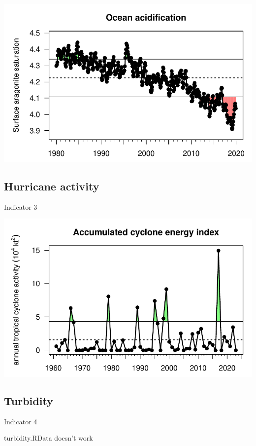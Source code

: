 \documentclass[
  letterpaper,
  oneside,
  open=any]{scrbook}
\begin{document}
\includegraphics{Report_book_files/Risk_indicators_files/figure-pdf/unnamed-chunk-2-1.pdf}

\hypertarget{hurricane-activity}{%
\subsection{Hurricane activity}\label{hurricane-activity}}

Indicator 3

\includegraphics{Report_book_files/Risk_indicators_files/figure-pdf/unnamed-chunk-3-1.pdf}

\hypertarget{turbidity}{%
\subsection{Turbidity}\label{turbidity}}

Indicator 4

turbidity.RData doesn't work
\end{document}
